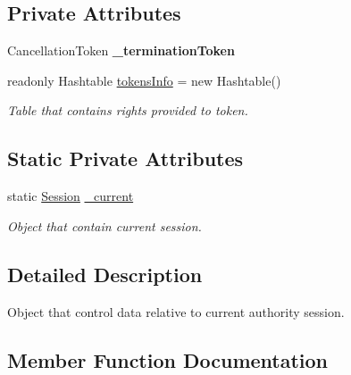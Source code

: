 \subsection*{Private Attributes}
\begin{DoxyCompactItemize}
\item 
\mbox{\label{class_authority_controller_1_1_session_ab5d41775c82bcc731fc4c85f9934469c}} 
Cancellation\+Token {\bfseries \+\_\+termination\+Token}
\item 
readonly Hashtable \mbox{\hyperlink{class_authority_controller_1_1_session_ab31f50a3b13fd88c44be84c0243ef6f9}{tokens\+Info}} = new Hashtable()
\begin{DoxyCompactList}\small\item\em Table that contains rights provided to token. \end{DoxyCompactList}\end{DoxyCompactItemize}
\subsection*{Static Private Attributes}
\begin{DoxyCompactItemize}
\item 
\mbox{\label{class_authority_controller_1_1_session_aacaa808a7220b2dc4cf40d5be5752256}} 
static \mbox{\hyperlink{class_authority_controller_1_1_session}{Session}} \mbox{\hyperlink{class_authority_controller_1_1_session_aacaa808a7220b2dc4cf40d5be5752256}{\+\_\+current}}
\begin{DoxyCompactList}\small\item\em Object that contain current session. \end{DoxyCompactList}\end{DoxyCompactItemize}


\subsection{Detailed Description}
Object that control data relative to current authority session. 



\subsection{Member Function Documentation}
\mbox{\label{class_authority_controller_1_1_session_a798dbdfeeb3ce9156d99d8b7962d9528}} 
